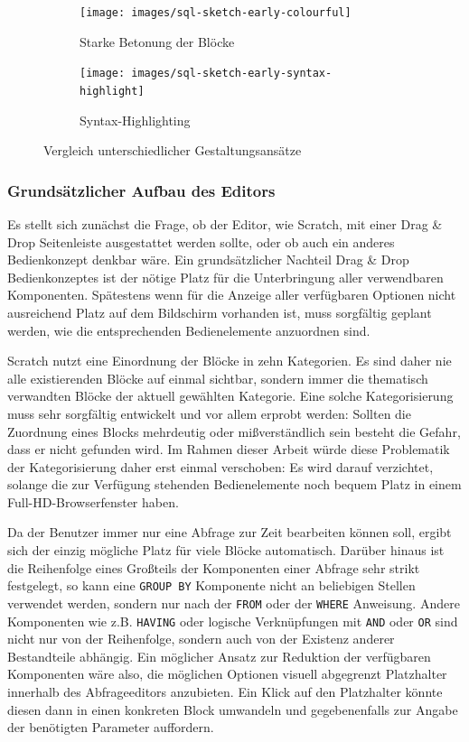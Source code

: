 \begin{figure}[h]
  \begin{subfigure}[b]{0.45\textwidth}
    \texttt{[image: images/sql-sketch-early-colourful]}
    \caption{Starke Betonung der Blöcke}
    \label{fig:screen-sql-editor-early-colourful}
  \end{subfigure}\hfill
  \begin{subfigure}[b]{0.45\textwidth}
    \texttt{[image: images/sql-sketch-early-syntax-highlight]}
    \caption{Syntax-Highlighting}
    \label{fig:screen-sql-editor-early-syntax-highlighting}
  \end{subfigure}
  \caption{Vergleich unterschiedlicher Gestaltungsansätze}
  \label{fig:compare-colourful}
\end{figure}

\subsubsection{Grundsätzlicher Aufbau des Editors}

Es stellt sich zunächst die Frage, ob der Editor, wie Scratch, mit einer Drag \& Drop Seitenleiste ausgestattet werden sollte, oder ob auch ein anderes Bedienkonzept denkbar wäre. Ein grundsätzlicher Nachteil Drag \& Drop Bedienkonzeptes ist der nötige Platz für die Unterbringung aller verwendbaren Komponenten. Spätestens wenn für die Anzeige aller verfügbaren Optionen nicht ausreichend Platz auf dem Bildschirm vorhanden ist, muss sorgfältig geplant werden, wie die entsprechenden Bedienelemente anzuordnen sind.

Scratch nutzt eine Einordnung der Blöcke in zehn Kategorien. Es sind daher nie alle existierenden Blöcke auf einmal sichtbar, sondern immer die thematisch verwandten Blöcke der aktuell gewählten Kategorie. Eine solche Kategorisierung muss sehr sorgfältig entwickelt und vor allem erprobt werden: Sollten die Zuordnung eines Blocks mehrdeutig oder mißverständlich sein besteht die Gefahr, dass er nicht gefunden wird. Im Rahmen dieser Arbeit würde diese Problematik der Kategorisierung daher erst einmal verschoben: Es wird darauf verzichtet, solange die zur Verfügung stehenden Bedienelemente noch bequem Platz in einem Full-HD-Browserfenster haben.

Da der Benutzer immer nur eine Abfrage zur Zeit bearbeiten können soll, ergibt sich der einzig mögliche Platz für viele Blöcke automatisch. Darüber hinaus ist die Reihenfolge eines Großteils der Komponenten einer Abfrage sehr strikt festgelegt, so kann eine \texttt{GROUP BY} Komponente nicht an beliebigen Stellen verwendet werden, sondern nur nach der \texttt{FROM} oder der \texttt{WHERE} Anweisung. Andere Komponenten wie z.B. \texttt{HAVING} oder logische Verknüpfungen mit \texttt{AND} oder \texttt{OR} sind nicht nur von der Reihenfolge, sondern auch von der Existenz anderer Bestandteile abhängig. Ein möglicher Ansatz zur Reduktion der verfügbaren Komponenten wäre also, die möglichen Optionen visuell abgegrenzt Platzhalter innerhalb des Abfrageeditors anzubieten. Ein Klick auf den Platzhalter könnte diesen dann in einen konkreten Block umwandeln und gegebenenfalls zur Angabe der benötigten Parameter auffordern.

